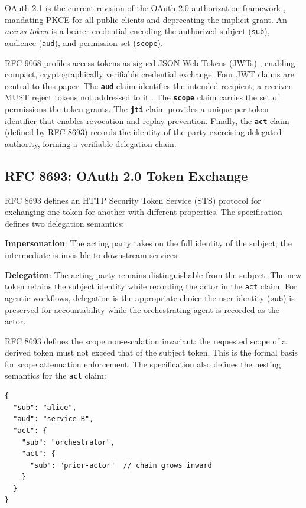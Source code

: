 \documentclass[journal]{IEEEtran}
\begin{document}
OAuth 2.1 \cite{oauth21} is the current revision of the OAuth 2.0 authorization
framework \cite{rfc6749}, mandating PKCE for all public clients and deprecating
the implicit grant. An \textit{access token} is a bearer credential encoding the
authorized subject (\texttt{sub}), audience (\texttt{aud}), and permission set
(\texttt{scope}).

RFC 9068 \cite{rfc9068} profiles access tokens as signed JSON Web Tokens
(JWTs) \cite{rfc7519}, enabling compact, cryptographically verifiable
credential exchange. Four JWT claims are central to this paper.
The \textbf{\texttt{aud}} claim identifies the intended recipient; a receiver
MUST reject tokens not addressed to it \cite{rfc9068}.
The \textbf{\texttt{scope}} claim carries the set of permissions the token grants.
The \textbf{\texttt{jti}} claim provides a unique per-token identifier that
enables revocation and replay prevention.
Finally, the \textbf{\texttt{act}} claim (defined by RFC 8693) records the
identity of the party exercising delegated authority, forming a verifiable
delegation chain.

\subsection{RFC 8693: OAuth 2.0 Token Exchange}

RFC 8693 \cite{rfc8693} defines an HTTP Security Token Service (STS) protocol
for exchanging one token for another with different properties. The specification
defines two delegation semantics:

\textbf{Impersonation}: The acting party takes on the full identity of the
subject; the intermediate is invisible to downstream services.

\textbf{Delegation}: The acting party remains distinguishable from the subject.
The new token retains the subject identity while recording the actor in the
\texttt{act} claim. For agentic workflows, delegation is the appropriate
choice the user identity ($\texttt{sub}$) is preserved for accountability while
the orchestrating agent is recorded as the actor.

RFC 8693 defines the scope non-escalation invariant: the requested scope of a
derived token must not exceed that of the subject token. This is the formal
basis for scope attenuation enforcement. The specification also defines the
nesting semantics for the \texttt{act} claim:

\begin{lstlisting}[language={},caption={Nested act claim per RFC 8693 \S 4.1},
                   label={lst:actchain}]
{
  "sub": "alice",
  "aud": "service-B",
  "act": {
    "sub": "orchestrator",
    "act": {
      "sub": "prior-actor"  // chain grows inward
    }
  }
}
\end{lstlisting}
\end{document}

